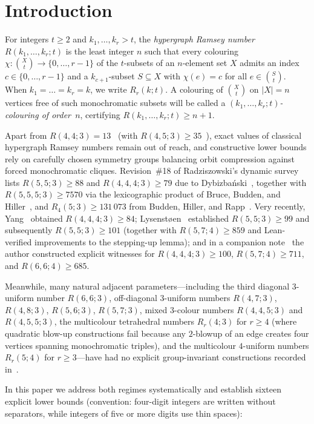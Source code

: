 \documentclass[11pt]{article}
\theoremstyle{remark}
\begin{document}
\section{Introduction}

For integers $t\ge 2$ and $k_1,\dots,k_r>t$, the \emph{hypergraph Ramsey number}
$R(k_1,\dots,k_r;t)$ is the least integer $n$ such that every colouring
$\chi\colon\binom{X}{t}\to\{0,\dots,r-1\}$ of the $t$-subsets of an $n$-element
set $X$ admits an index $c\in\{0,\dots,r-1\}$ and a $k_{c+1}$-subset
$S\subseteq X$ with $\chi(e)=c$ for all $e\in\binom{S}{t}$. When
$k_1=\dots=k_r=k$, we write $R_r(k;t)$. A colouring of $\binom{X}{t}$ on
$|X|=n$ vertices free of such monochromatic subsets will be called a
\emph{$(k_1,\dots,k_r;t)$-colouring of order~$n$}, certifying
$R(k_1,\dots,k_r;t)\ge n+1$.

Apart from $R(4,4;3)=13$~\cite{mr1} (with $R(4,5;3)\ge 35$~\cite{dyb2}), exact
values of classical hypergraph Ramsey numbers remain out of reach, and
constructive lower bounds rely on carefully chosen symmetry groups balancing
orbit compression against forced monochromatic cliques. Revision~\#18 of
Radziszowski's dynamic survey~\cite[Section~7.1]{survey} lists $R(5,5;3)\ge 88$
and $R(4,4,4;3)\ge 79$ due to Dybizba\'nski~\cite{dyb3}, together with
$R(5,5,5;3)\ge 7570$ via the lexicographic product of Bruce, Budden, and
Hiller~\cite{brbh}, and $R_4(5;3)\ge 131\,073$ from Budden, Hiller, and
Rapp~\cite{budhr1}. Very recently, Yang~\cite{yang} obtained $R(4,4,4;3)\ge 84$;
Lysenst{\o}en~\cite{lysenstoen1,lysenstoen2} established $R(5,5;3)\ge 99$ and
subsequently $R(5,5;3)\ge 101$ (together with $R(5,7;4)\ge 859$ and
Lean-verified improvements to the stepping-up lemma); and in a companion
note~\cite{hashimoto1} the author constructed explicit witnesses for
$R(4,4,4;3)\ge 100$, $R(5,7;4)\ge 711$, and $R(6,6;4)\ge 685$.

Meanwhile, many natural adjacent parameters---including the third diagonal
$3$-uniform number $R(6,6;3)$, off-diagonal $3$-uniform numbers $R(4,7;3)$,
$R(4,8;3)$, $R(5,6;3)$, $R(5,7;3)$, mixed $3$-colour numbers $R(4,4,5;3)$ and
$R(4,5,5;3)$, the multicolour tetrahedral numbers $R_r(4;3)$ for $r\ge 4$ (where
quadratic blow-up constructions fail because any $2$-blowup of an edge creates
four vertices spanning monochromatic triples), and the multicolour $4$-uniform
numbers $R_r(5;4)$ for $r\ge 3$---have had no explicit group-invariant
constructions recorded in~\cite{survey}.

In this paper we address both regimes systematically and establish sixteen
explicit lower bounds (convention: four-digit integers are written without
separators, while integers of five or more digits use thin spaces):
\end{document}

